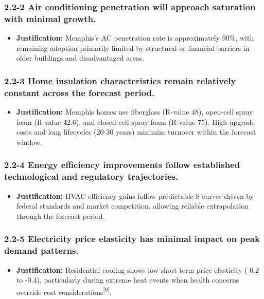 \documentclass{article}
\begin{document}
\subsubsection*{2.2-2 Air conditioning penetration will approach saturation with minimal growth.}
\begin{itemize}
    \item \textbf{Justification:} 
Memphis's AC penetration rate is approximately 90\%, with remaining adoption primarily limited by structural or financial barriers in older buildings and disadvantaged areas.

\end{itemize}

\subsubsection*{2.2-3 Home insulation characteristics remain relatively constant across the forecast period.}
\begin{itemize}
    \item \textbf{Justification:} 
Memphis homes use fiberglass (R-value 48), open-cell spray foam (R-value 42.6), and closed-cell spray foam (R-value 75). High upgrade costs and long lifecycles (20-30 years) minimize turnover within the forecast window.

\end{itemize}

\subsubsection*{2.2-4 Energy efficiency improvements follow established technological and regulatory trajectories.}
\begin{itemize}
    \item \textbf{Justification:} 
HVAC efficiency gains follow predictable S-curves driven by federal standards and market competition, allowing reliable extrapolation through the forecast period.

\end{itemize}

\subsubsection*{2.2-5 Electricity price elasticity has minimal impact on peak demand patterns.}
\begin{itemize}
    \item \textbf{Justification:} 
Residential cooling shows low short-term price elasticity (-0.2 to -0.4), particularly during extreme heat events when health concerns override cost considerations\textsuperscript{[9]}.

\end{itemize}
\end{document}
